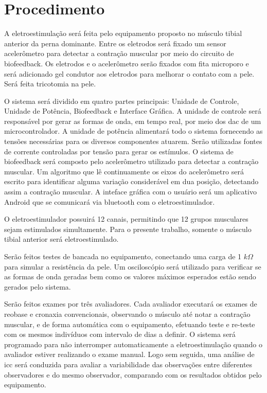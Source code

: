 \section{Procedimento}
A eletroestimulação será feita pelo equipamento proposto no músculo tibial anterior da perna dominante. Entre os eletrodos será fixado um sensor acelerômetro para detectar a contração muscular por meio do circuito de biofeedback. Os eletrodos e o acelerômetro serão fixados com fita microporo e será adicionado gel condutor aos eletrodos para melhorar o contato com a pele. Será feita tricotomia na pele.

O sistema será dividido em quatro partes principais: Unidade de Controle, Unidade de Potência, Biofeedback e Interface Gráfica. A unidade de controle será responsável por gerar as formas de onda, em tempo real, por meio dos \ac{dac} de um microcontrolador. A unidade de potência alimentará todo o sistema fornecendo as tensões necessárias para os diversos componentes atuarem. Serão utilizadas fontes de corrente controladas por tensão para gerar os estímulos. O sistema de biofeedback será composto pelo acelerômetro utilizado para detectar a contração muscular. Um algoritmo que lê continuamente os eixos do acelerômetro será escrito para identificar alguma variação considerável em dua posição, detectando assim a contração muscular. A inteface gráfica com o usuário será um aplicativo Android que se comunicará via bluetooth com o eletroestimulador.

O eletroestimulador possuirá 12 canais, permitindo que 12 grupos musculares sejam estimulados simultamente. Para o presente trabalho, somente o músculo tibial anterior será eletroestimulado.

Serão feitos testes de bancada no equipamento, conectando uma carga de 1 $k\Omega$ para simular a resistência da pele. Um osciloscópio será utilizado para verificar se as formas de onda geradas bem como os valores máximos esperados estão sendo gerados pelo sistema.

Serão feitos exames por três avaliadores. Cada avaliador executará os exames de reobase e cronaxia convencionais, observando o músculo até notar a contração muscular, e de forma automática com o equipamento, efetuando teste e re-teste com os mesmos indivíduos com intervalo de dias a definir. O sistema será programado para não interromper automaticamente a eletroestimulação quando o avaliador estiver realizando o exame manual. Logo sem seguida, uma análise de \ac{icc} será conduzida para avaliar a variabilidade das observações entre diferentes observadores e do mesmo observador, comparando com os resultados obtidos pelo equipamento.


